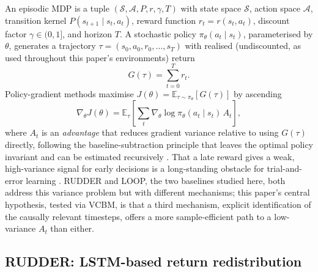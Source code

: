 \documentclass[conference]{IEEEtran}
\begin{document}
An episodic MDP \cite{b_sutton2018rlbook} is a tuple $(\mathcal{S}, \mathcal{A}, P, r, \gamma, T)$ with state space $\mathcal{S}$, action space $\mathcal{A}$, transition kernel $P(s_{t+1} \mid s_t, a_t)$, reward function $r_t = r(s_t, a_t)$, discount factor $\gamma \in (0,1]$, and horizon $T$. A stochastic policy $\pi_\theta(a_t \mid s_t)$, parameterised by $\theta$, generates a trajectory $\tau = (s_0, a_0, r_0, \dots, s_T)$ with realised (undiscounted, as used throughout this paper's environments) return
\begin{equation}
  G(\tau) = \sum_{t=0}^{T} r_t .
  \label{eq:return}
\end{equation}
Policy-gradient methods \cite{b_sutton1999policygradient} maximise $J(\theta) = \mathbb{E}_{\tau \sim \pi_\theta}[G(\tau)]$ by ascending
\begin{equation}
  \nabla_\theta J(\theta) = \mathbb{E}_{\tau}\!\left[\sum_t \nabla_\theta \log \pi_\theta(a_t \mid s_t)\, A_t\right] ,
  \label{eq:policy-gradient}
\end{equation}
where $A_t$ is an \emph{advantage} that reduces gradient variance relative to using $G(\tau)$ directly, following the baseline-subtraction principle that leaves the optimal policy invariant \cite{b_ng1999shaping} and can be estimated recursively \cite{b_schulman2016gae}. That a late reward gives a weak, high-variance signal for early decisions is a long-standing obstacle for trial-and-error learning \cite{b_minsky1961steps}. RUDDER and LOOP, the two baselines studied here, both address this variance problem but with different mechanisms; this paper's central hypothesis, tested via VCBM, is that a third mechanism, explicit identification of the causally relevant timesteps, offers a more sample-efficient path to a low-variance $A_t$ than either.

\subsection{RUDDER: LSTM-based return redistribution}
\label{sec:prelim-rudder}
\end{document}
